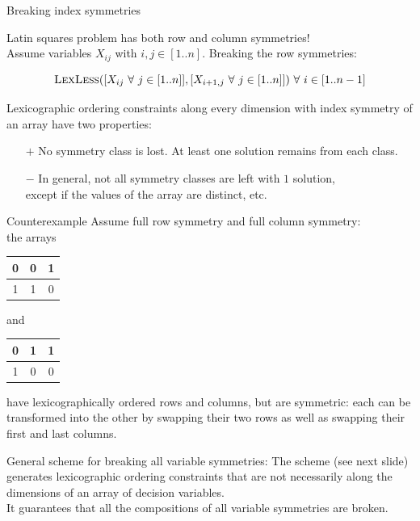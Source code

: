 \documentclass{cons-beamer}
\begin{document}
\begin{frame}{Breaking index symmetries}
\begin{example}
    \alert{Latin squares problem has both row and column symmetries!} 
    \\[+5pt]
    Assume variables $X_{ij}$ with $i,j \in [1..n]$.
    Breaking the row symmetries:

    $$\textsc{LexLess}([X_{ij} \text{ } \forall \text{ } j \in [1..n]] , [X_{i+1,j} \text{ } \forall \text{ } j \in [1..n]]) \text{ } \forall \text{ } i \in [1..n-1]$$
  \end{example}
\end{frame}

\begin{frame}\label{lex2:counterex}
  Lexicographic ordering constraints along \alert{every} dimension
  with index symmetry of an array have two properties:
  \begin{itemize}
    \item[$+$] No symmetry class is lost. At least one solution remains from each class.
    \item[$-$] In general, \alert{not} all symmetry classes are left with $1$ solution, \\ except if the values of the array are distinct, etc.
  \end{itemize} \vfill
  \begin{block}{Counterexample}
    Assume full row symmetry and full column symmetry: \\ the arrays
    \begin{tabular}{|c|c|c|}
      \hline
      0 & 0 & 1 \\
      \hline
      1 & 1 & 0 \\
      \hline
    \end{tabular}
    and
    \begin{tabular}{|c|c|c|}
      \hline
      0 & 1 & 1 \\
      \hline
      1 & 0 & 0 \\
      \hline
    \end{tabular}
    have lexicographically ordered rows \alert{and} columns, but are
    symmetric: each can be transformed into the other by swapping
    their two rows as well as swapping their first and last columns.
  \end{block}
  \vfill
  
  General scheme for breaking all variable symmetries: The  scheme (see next slide) generates lexicographic ordering constraints that are not necessarily along the dimensions
  of an array of decision variables. \\ 
  \alert{It guarantees that all the compositions of all variable symmetries are broken}.
\end{frame}
\end{document}
